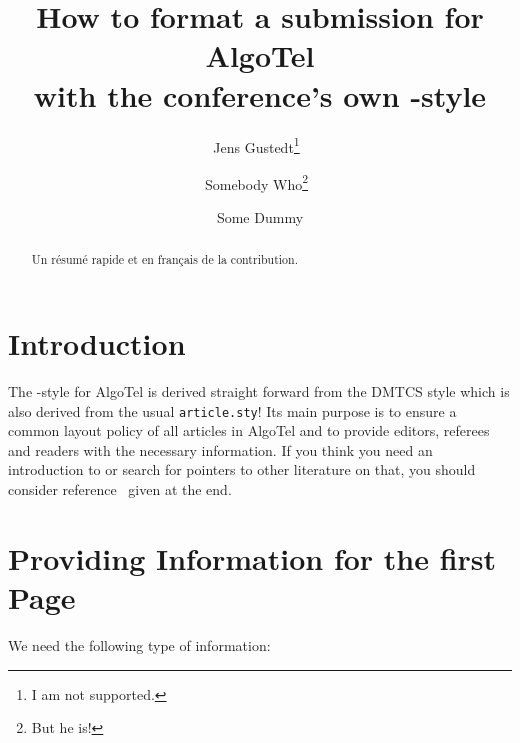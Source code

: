\documentclass[%
]{algotel}
\author{Jens Gustedt\addressmark{1}\thanks{I am not supported.}{\ }
  \and Somebody Who\addressmark{2}\thanks{But he is!}{\ }
  \and Some Dummy\addressmark{1}}
\title[Formatting a submission for AlgoTel]{How to format a submission for AlgoTel\\  with the conference's own \LaTeXe-style}
\begin{document}
\maketitle

\begin{abstract}
Un résumé rapide et en fran\c{c}ais de la contribution. 
\end{abstract}

\section{Introduction}
\label{sec:in}
The \LaTeXe-style for AlgoTel  is  derived straight forward from  the
DMTCS style which is also derived from the usual \texttt{article.sty}!
Its main purpose is to  ensure a common layout  policy of all articles
in AlgoTel and   to provide  editors,  referees and  readers  with the
necessary information.  If  you think  you   need an introduction   to
\LaTeXe or search  for  pointers to other   literature on  that,  you
should consider  reference~\cite{oetiker99:_not_so_short_introd_latex}
given at the end.

\bigskip


\section{Providing Information for the first Page}
\label{sec:first}


We need the following type of information:
\end{document}
